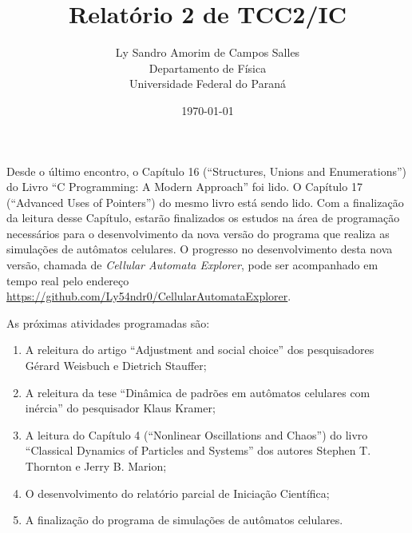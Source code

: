 \documentclass[12pt,a4paper,final]{article}
\title{Relatório 2 de TCC2/IC}
\author{Ly Sandro Amorim de Campos Salles\\Departamento de Física\\Universidade Federal do Paraná}
\date{\today}
\begin{document}
	\maketitle

	Desde o último encontro, o Capítulo 16 (``Structures, Unions and Enumerations'') do Livro ``C Programming: A Modern Approach'' foi lido.
  O Capítulo 17 (``Advanced Uses of Pointers'') do mesmo livro está sendo lido. Com a finalização da leitura desse Capítulo, estarão finalizados os estudos na área de programação necessários para o desenvolvimento da nova versão do programa que realiza as simulações de autômatos celulares. O progresso no desenvolvimento desta nova versão, chamada de \textit{Cellular Automata Explorer}, pode ser acompanhado em tempo real pelo endereço \url{https://github.com/Ly54ndr0/CellularAutomataExplorer}.
	
	As próximas atividades programadas são:
	\begin{enumerate}
		\item A releitura do artigo ``Adjustment and social choice'' dos pesquisadores Gérard Weisbuch e Dietrich Stauffer; 
		\item A releitura da tese ``Dinâmica de padrões em autômatos celulares com inércia'' do pesquisador Klaus Kramer;
		\item A leitura do Capítulo 4 (``Nonlinear Oscillations and Chaos'') do livro ``Classical Dynamics of Particles and Systems'' dos autores Stephen T. Thornton e Jerry B. Marion;
		\item O desenvolvimento do relatório parcial de Iniciação Científica;
		\item A finalização do programa de simulações de autômatos celulares.
	\end{enumerate}
\end{document}
